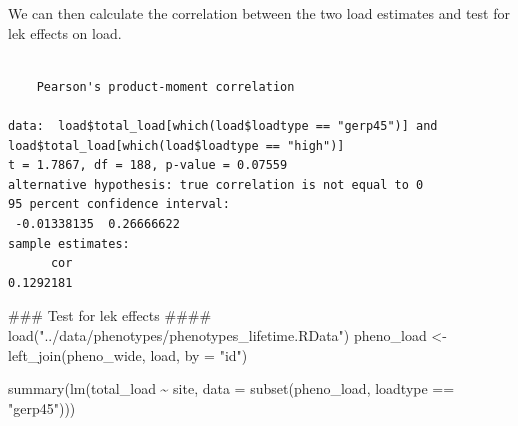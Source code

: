 \documentclass[
  letterpaper,
  DIV=11,
  numbers=noendperiod]{scrreprt}
\newenvironment{Shaded}{}{}
\newcommand{\AttributeTok}[1]{\textcolor[rgb]{0.84,0.23,0.29}{#1}}
\newcommand{\DocumentationTok}[1]{\textcolor[rgb]{0.42,0.45,0.49}{#1}}
\newcommand{\FunctionTok}[1]{\textcolor[rgb]{0.44,0.26,0.76}{#1}}
\newcommand{\NormalTok}[1]{\textcolor[rgb]{0.14,0.16,0.18}{#1}}
\newcommand{\OtherTok}[1]{\textcolor[rgb]{0.44,0.26,0.76}{#1}}
\newcommand{\SpecialCharTok}[1]{\textcolor[rgb]{0.00,0.36,0.77}{#1}}
\newcommand{\StringTok}[1]{\textcolor[rgb]{0.01,0.18,0.38}{#1}}
\begin{document}
We can then calculate the correlation between the two load estimates and
test for lek effects on load.

\begin{Shaded}
\end{Shaded}

\begin{verbatim}

    Pearson's product-moment correlation

data:  load$total_load[which(load$loadtype == "gerp45")] and load$total_load[which(load$loadtype == "high")]
t = 1.7867, df = 188, p-value = 0.07559
alternative hypothesis: true correlation is not equal to 0
95 percent confidence interval:
 -0.01338135  0.26666622
sample estimates:
      cor 
0.1292181 
\end{verbatim}

\begin{Shaded}
\begin{Highlighting}[]
\DocumentationTok{\#\#\# Test for lek effects \#\#\#\#}
\FunctionTok{load}\NormalTok{(}\StringTok{"../data/phenotypes/phenotypes\_lifetime.RData"}\NormalTok{)}
\NormalTok{pheno\_load }\OtherTok{\textless{}{-}} \FunctionTok{left\_join}\NormalTok{(pheno\_wide, load, }\AttributeTok{by =} \StringTok{"id"}\NormalTok{)}

\FunctionTok{summary}\NormalTok{(}\FunctionTok{lm}\NormalTok{(total\_load }\SpecialCharTok{\textasciitilde{}}\NormalTok{ site, }\AttributeTok{data =} \FunctionTok{subset}\NormalTok{(pheno\_load, loadtype }\SpecialCharTok{==} \StringTok{"gerp45"}\NormalTok{)))}
\end{Highlighting}
\end{Shaded}
\end{document}
